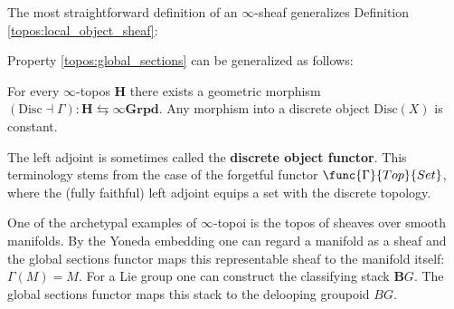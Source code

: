     The most straightforward definition of an $\infty$-sheaf generalizes Definition \ref{topos:local_object_sheaf}:

    Property \ref{topos:global_sections} can be generalized as follows:
    \begin{property}
        For every $\infty$-topos $\mathbf{H}$ there exists a geometric morphism $(\mathrm{Disc}\dashv\Gamma):\mathbf{H}\leftrightarrows\infty\mathbf{Grpd}$. Any morphism into a discrete object $\mathrm{Disc}(X)$ is constant.

        The left adjoint is sometimes called the \textbf{discrete object functor}. This terminology stems from the case of the forgetful functor $\func{\Gamma}{Top}{Set}$, where the (fully faithful) left adjoint equips a set with the discrete topology.
    \end{property}
    \begin{example}
        One of the archetypal examples of $\infty$-topoi is the topos of sheaves over smooth manifolds. By the Yoneda embedding one can regard a manifold as a sheaf and the global sections functor maps this representable sheaf to the manifold itself: $\Gamma(M)=M$. For a Lie group one can construct the classifying stack $\mathbf{B}G$. The global sections functor maps this stack to the delooping groupoid $BG$.
    \end{example}


